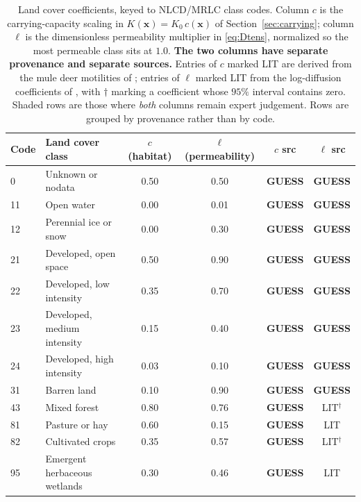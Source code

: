 \documentclass[11pt]{article}
\newcommand{\tagLIT}{{\footnotesize\textsf{\textcolor{green!40!black}{LIT}}}}
\newcommand{\tagGUESS}{{\footnotesize\textsf{\textbf{\textcolor{red!70!black}{GUESS}}}}}
\newcommand{\guessrow}{\rowcolor{guessbg}}
\begin{document}
\begin{table}[h]
\centering
\small
\caption{Land cover coefficients, keyed to NLCD/MRLC class codes. Column $c$ is the carrying-capacity scaling in $K(\mathbf{x})=K_0\,c(\mathbf{x})$ of Section~\ref{sec:carrying}; column $\ell$ is the dimensionless permeability multiplier in \eqref{eq:Dtens}, normalized so the most permeable class sits at $1.0$. \textbf{The two columns have separate provenance and separate sources.} Entries of $c$ marked \tagLIT{} are derived from the mule deer motilities of \citet{Garlick2013}; entries of $\ell$ marked \tagLIT{} from the log-diffusion coefficients of \citet{MandujanoReyes2025}, with $\dagger$ marking a coefficient whose $95\%$ interval contains zero. Shaded rows are those where \emph{both} columns remain expert judgement. Rows are grouped by provenance rather than by code.}
\label{tab:landcover-values}
\begin{tabular}{@{}llcccc@{}}
\toprule
Code & Land cover class & $c$ (habitat) & $\ell$ (permeability) & $c$ src & $\ell$ src \\
\midrule
\guessrow 0  & Unknown or nodata            & 0.50 & 0.50 & \tagGUESS{} & \tagGUESS{} \\
\guessrow 11 & Open water                   & 0.00 & 0.01 & \tagGUESS{} & \tagGUESS{} \\
\guessrow 12 & Perennial ice or snow        & 0.00 & 0.30 & \tagGUESS{} & \tagGUESS{} \\
\guessrow 21 & Developed, open space        & 0.50 & 0.90 & \tagGUESS{} & \tagGUESS{} \\
\guessrow 22 & Developed, low intensity     & 0.35 & 0.70 & \tagGUESS{} & \tagGUESS{} \\
\guessrow 23 & Developed, medium intensity  & 0.15 & 0.40 & \tagGUESS{} & \tagGUESS{} \\
\guessrow 24 & Developed, high intensity    & 0.03 & 0.10 & \tagGUESS{} & \tagGUESS{} \\
\guessrow 31 & Barren land                  & 0.10 & 0.90 & \tagGUESS{} & \tagGUESS{} \\
\guessrow 43 & Mixed forest                 & 0.80 & 0.76 & \tagGUESS{} & \tagLIT{}$^\dagger$ \\
\guessrow 81 & Pasture or hay               & 0.60 & 0.15 & \tagGUESS{} & \tagLIT{} \\
\guessrow 82 & Cultivated crops             & 0.35 & 0.57 & \tagGUESS{} & \tagLIT{}$^\dagger$ \\
\guessrow 95 & Emergent herbaceous wetlands & 0.30 & 0.46 & \tagGUESS{} & \tagLIT{} \\

\end{tabular}
\end{table}
\end{document}
